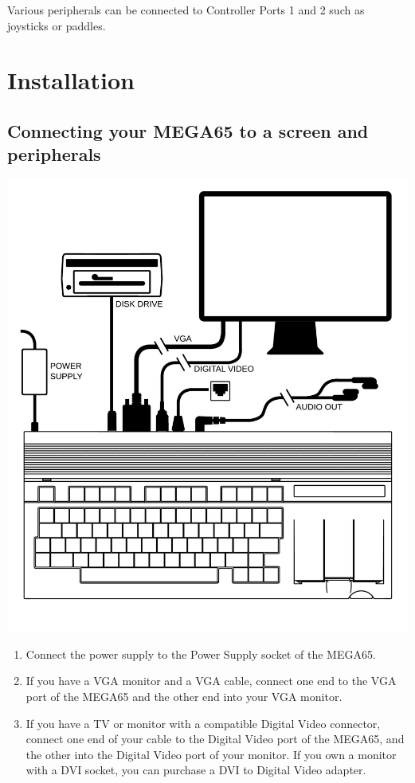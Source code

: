 Various peripherals can be connected to Controller Ports 1 and 2 such as joysticks or paddles.

\newpage

\section{Installation}

\subsection{Connecting your MEGA65 to a screen and peripherals}

\includegraphics[width=\linewidth]{images/illustrations/mega65-top.pdf}

\newpage

\begin{enumerate}
	\item Connect the power supply to the Power Supply socket of the MEGA65.
	\item If you have a VGA monitor and a VGA cable, connect one end to the VGA port of the MEGA65 and the other end into your VGA monitor.
	\item If you have a TV or monitor with a compatible Digital Video connector, connect one end of your cable to the Digital Video port of the MEGA65, and the other into the Digital Video port of your monitor. If you own a monitor with a DVI socket, you can purchase a DVI to Digital Video adapter.
\end{enumerate}

